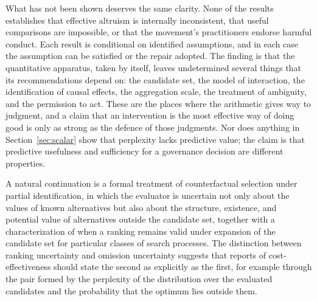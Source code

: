 \documentclass[11pt]{article}
\theoremstyle{definition}
\theoremstyle{remark}
\begin{document}
What has not been shown deserves the same clarity. None of the results establishes that effective altruism is internally inconsistent, that useful comparisons are impossible, or that the movement's practitioners endorse harmful conduct. Each result is conditional on identified assumptions, and in each case the assumption can be satisfied or the repair adopted. The finding is that the quantitative apparatus, taken by itself, leaves undetermined several things that its recommendations depend on: the candidate set, the model of interaction, the identification of causal effects, the aggregation scale, the treatment of ambiguity, and the permission to act. These are the places where the arithmetic gives way to judgment, and a claim that an intervention is the most effective way of doing good is only as strong as the defence of those judgments. Nor does anything in Section~\ref{sec:scalar} show that perplexity lacks predictive value; the claim is that predictive usefulness and sufficiency for a governance decision are different properties.

A natural continuation is a formal treatment of counterfactual selection under partial identification, in which the evaluator is uncertain not only about the values of known alternatives but also about the structure, existence, and potential value of alternatives outside the candidate set, together with a characterization of when a ranking remains valid under expansion of the candidate set for particular classes of search processes. The distinction between ranking uncertainty and omission uncertainty suggests that reports of cost-effectiveness should state the second as explicitly as the first, for example through the pair formed by the perplexity of the distribution over the evaluated candidates and the probability that the optimum lies outside them.
\end{document}
